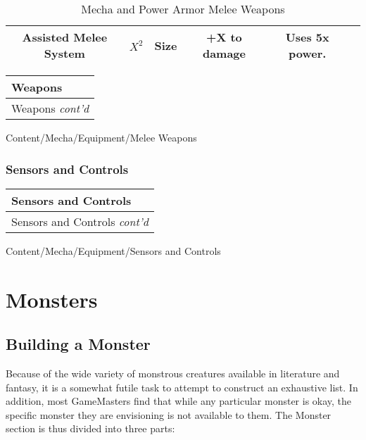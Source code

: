 \documentclass[twoside]{book}
\begin{document}
\begin{table}[htb]
\begin{center}
\begin{tabular}{|c|c|c|c|c|c|}
\hline

 Assisted Melee System &  \begin{math}
                      {X}^{ 2 }\end{math}  
                  & Size & +X to damage & Uses 5x power. \\

\hline


  \end{tabular}
  
\caption{Mecha and Power Armor Melee Weapons}
  
  \end{center}
\end{table}
  
\begin{longtable}{p{1.25in}} 
  Weapons
  \\
  \hline
  \hline
  \endfirsthead
  Weapons \textit{cont'd}
        
  \\
  \endhead
      
\end{longtable}
    Content/Mecha/Equipment/Melee Weapons
    

\subsection{Sensors and Controls}
    
\begin{longtable}{p{1.25in}} 
  Sensors and Controls
  \\
  \hline
  \hline
  \endfirsthead
  Sensors and Controls \textit{cont'd}
        
  \\
  \endhead
      
\end{longtable}
    Content/Mecha/Equipment/Sensors and                Controls
    

\chapter{Monsters}
    
    

\section{Building a Monster}
     Because of the wide variety of monstrous creatures
             available in literature and fantasy, it is a somewhat futile
             task to attempt to construct an exhaustive list. In
             addition, most GameMasters find that while any particular
             monster is okay, the specific monster they are envisioning
             is not available to them. The Monster section is thus
             divided into three parts: 
\begin{description}
    
  \item[] 
  \item[] 
  \item[] 
\end{description}
  
\end{document}
